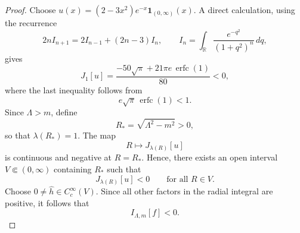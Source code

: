 \documentclass[10pt,a4paper]{amsart}
\begin{document}
\begin{proof}
Choose $u(x)=(2-3x^2)e^{-x}\mathbf{1}_{(0,\infty)}(x)$. A direct calculation, using the recurrence
\begin{equation}
    2nI_{n+1}=2I_{n-1}+(2n-3)I_n,
    \qquad
    I_n=\int_{\mathbb{R}}\frac{e^{-q^2}}{(1+q^2)^n}\,dq,
\end{equation}
gives
\begin{equation} 
    J_1[u]
    =
    \frac{-50\sqrt{\pi}+21\pi e\,\operatorname{erfc}(1)}{80}
    <0,
\end{equation}
where the last inequality follows from
\begin{equation}
e\sqrt{\pi}\,\operatorname{erfc}(1)<1.
\end{equation}
Since $\Lambda>m$, define
\begin{equation}
R_*=\sqrt{\Lambda^2-m^2}>0,
\end{equation}
so that $\lambda(R_*)=1$. The map
\begin{equation}
R\longmapsto J_{\lambda(R)}[u]
\end{equation}
is continuous and negative at $R=R_*$. Hence, there exists an open interval $V\Subset(0,\infty)$ containing $R_*$ such that
\begin{equation}
J_{\lambda(R)}[u]<0
\qquad\text{for all }R\in V.
\end{equation}
Choose $0\neq\widehat{h}\in C_c^\infty(V)$. Since all other factors in the radial integral are positive, it follows that
\begin{equation}
I_{\Lambda,m}[f]<0.
\end{equation}
\end{proof}
\end{document}
